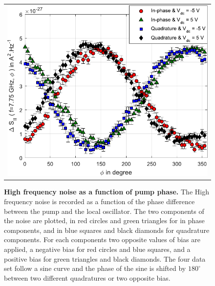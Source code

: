 \begin{figure}[hptb]
	\begin{center}
		\begin{tabular}{c}
			\includegraphics[width = 6.5 cm]{./chap3/RF_noise_vs_pump_phase}
		\end{tabular}
	\end{center}
	
	\caption{\textbf{High frequency noise as a function of pump phase.} The High frequency noise is recorded as a function of the phase difference between the pump and the local oscillator. The two components of the noise are plotted, in red circles and green triangles for in phase components, and in blue squares and black diamonds for quadrature components. For each components two opposite values of bias are applied, a negative bias for red circles and blue squares, and a positive bias for green triangles and black diamonds. The four data set follow a sine curve and the phase of the sine is shifted by $180^{\circ}$ between two different quadratures or two opposite bias.}
	\label{fig: noise pump vs phase}
\end{figure}

